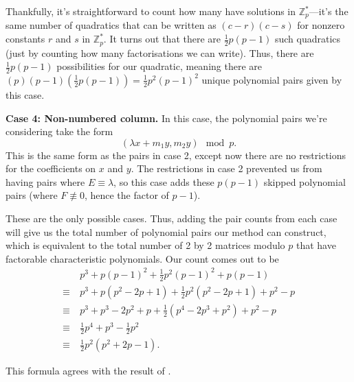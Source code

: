 \documentclass[a4paper, 12pt, reqno]{amsart}
\newcommand{\Z}{\mathbb{Z}}
\begin{document}
	Thankfully, it's straightforward to count how many have solutions in $\Z_p^*$---it's the same number of quadratics that can be written as $(c-r)(c-s)$ for nonzero 
	constants $r$ and $s$ in $\Z_p^*$. It turns out that there are $\frac{1}{2}p(p-1)$ such quadratics (just by counting how many factorisations we can write). Thus, there 
	are $\frac{1}{2}p(p-1)$ possibilities for our quadratic, meaning there are $(p)(p-1)(\frac{1}{2}p(p-1)) = \frac{1}{2}p^2(p-1)^2$ unique polynomial pairs given by this case.
	
	\textbf{Case 4: Non-numbered column.} In this case, the polynomial pairs we're considering take the form
	\[
		(\lambda x + m_1y, m_2y) \mod{p}.
	\]
	This is the same form as the pairs in case 2, except now there are no restrictions for the coefficients on $x$ and $y$. The restrictions in case 2 prevented us from having 
	pairs where $E \equiv \lambda$, so this case adds these $p(p-1)$ skipped polynomial pairs (where $F \not\equiv 0$, hence the factor of $p-1$).
	
	These are the only possible cases. Thus, adding the pair counts from each case will give us the total number of polynomial pairs our method can construct, which is 
	equivalent to the total number of 2 by 2 matrices modulo $p$ that have factorable characteristic polynomials. Our count comes out to be
	\begin{align*}
		       &\ p^3 + p(p-1)^2 + \frac{1}{2}p^2(p-1)^2 + p(p-1)                \\
		\equiv &\ p^3 + p(p^2 - 2p + 1) + \frac{1}{2}p^2(p^2 - 2p + 1) + p^2 - p \\
		\equiv &\ p^3 + p^3 - 2p^2 + p + \frac{1}{2}(p^4 - 2p^3 + p^2) + p^2 - p \\
		\equiv &\ \frac{1}{2}p^4 + p^3 - \frac{1}{2}p^2                          \\
		\equiv &\ \frac{1}{2}p^2(p^2 + 2p - 1).
	\end{align*}
	
	This formula agrees with the result of \citet{Olsavsky2003}.
	
	
	
\end{document}
